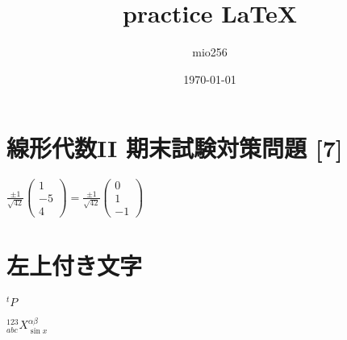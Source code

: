 \documentclass[a4paper,11pt]{jsarticle}
\begin{document}
\title{practice \LaTeX}
\author{mio256}
\date{\today}
\maketitle

\section{線形代数II 期末試験対策問題 [7]}

$\frac{\pm1}{\sqrt{42}}
  \left(\begin{matrix}
    1\\
    -5\\
    4
  \end{matrix}\right)
  =
  \frac{\pm1}{\sqrt{42}}
  \left(\begin{matrix}
    0\\
    1\\
    -1
  \end{matrix}\right)$

\section{左上付き文字}

$^{t}P$

$^{123}_{abc}X^{\alpha\beta}_{\sin{x}}$
\end{document}
